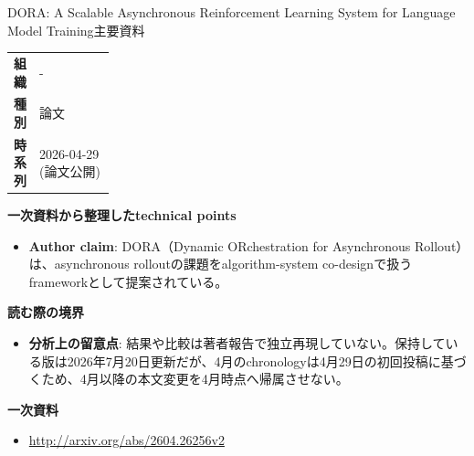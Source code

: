\begin{technicalnote}{DORA: A Scalable Asynchronous Reinforcement Learning System for Language Model Training}{主要資料}
\begingroup
\begin{tabularx}{\linewidth}{@{}>{\bfseries}p{0.22\linewidth}X@{}}
組織 & - \\
種別 & 論文 \\
時系列 & 2026-04-29 (論文公開) \\
\end{tabularx}
\smallskip
{\bfseries 一次資料から整理したtechnical points}
\begin{itemize}[leftmargin=1.5em,itemsep=0.35em]
\item \textbf{Author claim}: DORA（Dynamic ORchestration for Asynchronous Rollout）は、asynchronous rolloutの課題をalgorithm-system co-designで扱うframeworkとして提案されている。
\end{itemize}
{\bfseries 読む際の境界}
\begin{itemize}[leftmargin=1.5em,itemsep=0.35em]
\item \textbf{分析上の留意点}: 結果や比較は著者報告で独立再現していない。保持している版は2026年7月20日更新だが、4月のchronologyは4月29日の初回投稿に基づくため、4月以降の本文変更を4月時点へ帰属させない。
\end{itemize}
\begin{samepage}
{\bfseries 一次資料}
\begingroup\sloppy
\begin{itemize}[leftmargin=1.5em,itemsep=0.25em]
\item {\scriptsize\url{http://arxiv.org/abs/2604.26256v2}}
\end{itemize}
\endgroup
\end{samepage}
\endgroup
\end{technicalnote}
\medskip

